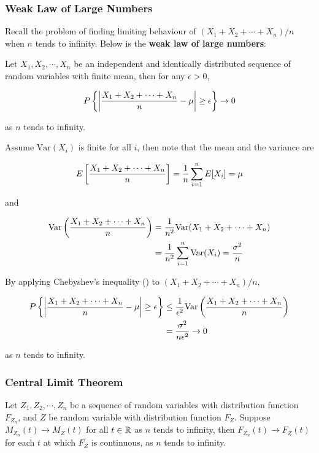 \documentclass[a4paper,12pt]{article}
\begin{document}
\subsubsection{Weak Law of Large Numbers}
Recall the problem of finding limiting behaviour of $(X_{1}+X_{2}+\cdots+X_{n})/n$ when $n$ tends to infinity. Below is the \textbf{weak law of large numbers}:\n

\begin{thm}
  Let $X_{1},X_{2},\cdots,X_{n}$ be an independent and identically distributed sequence of random variables with finite mean, then for any $\epsilon>0$,

  $$P\left\{ \left| \frac{X_{1}+X_{2}+\cdots+X_{n}}{n}-\mu\right|\geq\epsilon\right\}\to 0$$\s

  as $n$ tends to infinity.\n

  \prf Assume $\mathrm{Var}(X_{i})$ is finite for all $i$, then note that the mean and the variance are

  $$E\left[ \frac{X_{1}+X_{2}+\cdots+X_{n}}{n}\right]=\frac{1}{n}\sum_{i=1}^{n}E[X_{i}]=\mu$$\s

  and

  $$\begin{aligned}[t]
    \mathrm{Var}\left( \frac{X_{1}+X_{2}+\cdots+X_{n}}{n}\right)&=\frac{1}{n^{2}}\mathrm{Var}(X_{1}+X_{2}+\cdots+X_{n})\\
    &=\frac{1}{n^{2}}\sum_{i=1}^{n}\mathrm{Var}(X_{i})=\frac{\sigma^{2}}{n}
  \end{aligned}$$\s

  By applying Chebyshev's inequality (\rthm[\sctd{3}]) to $(X_{1}+X_{2}+\cdots+X_{n})/n$,

  $$\begin{aligned}[t]
    P\left\{ \left| \frac{X_{1}+X_{2}+\cdots+X_{n}}{n}-\mu\right|\geq\epsilon\right\}&\leq\frac{1}{\epsilon^{2}}\mathrm{Var}\left( \frac{X_{1}+X_{2}+\cdots+X_{n}}{n}\right)\\
    &=\frac{\sigma^{2}}{n\epsilon^{2}}\to 0
  \end{aligned}$$\s

  as $n$ tends to infinity.
\end{thm}

\subsubsection{Central Limit Theorem}
\begin{pst}
  Let $Z_{1},Z_{2},\cdots,Z_{n}$ be a sequence of random variables with distribution function $F_{Z_{n}}$, and $Z$ be random variable with distribution function $F_{Z}$. Suppose $M_{Z_{n}}(t)\to M_{Z}(t)$ for all $t\in\mathbb{R}$ as $n$ tends to infinity, then $F_{Z_{n}}(t)\to F_{Z}(t)$ for each $t$ at which $F_{Z}$ is continuous, as $n$ tends to infinity.
\end{pst}\n
\end{document}
